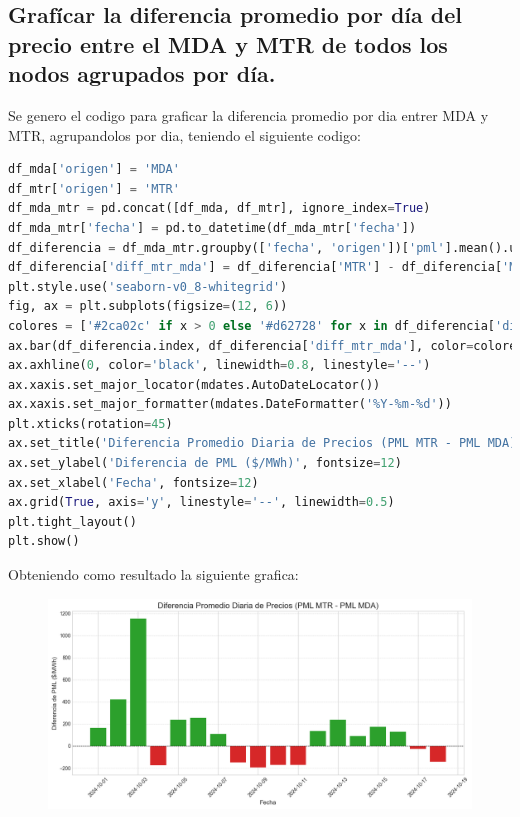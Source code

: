 \documentclass[11pt, a4paper]{article}
\begin{document}
\newpage
\subsection{Grafícar la diferencia promedio por día del precio entre el MDA y MTR de todos los nodos agrupados por día.}

Se genero el codigo para graficar la diferencia promedio por dia entrer MDA y MTR, agrupandolos por dia, teniendo el siguiente codigo:

\begin{lstlisting}[language=Python]
df_mda['origen'] = 'MDA'
df_mtr['origen'] = 'MTR'
df_mda_mtr = pd.concat([df_mda, df_mtr], ignore_index=True)
df_mda_mtr['fecha'] = pd.to_datetime(df_mda_mtr['fecha'])
df_diferencia = df_mda_mtr.groupby(['fecha', 'origen'])['pml'].mean().unstack()
df_diferencia['diff_mtr_mda'] = df_diferencia['MTR'] - df_diferencia['MDA']
plt.style.use('seaborn-v0_8-whitegrid')
fig, ax = plt.subplots(figsize=(12, 6))
colores = ['#2ca02c' if x > 0 else '#d62728' for x in df_diferencia['diff_mtr_mda']]
ax.bar(df_diferencia.index, df_diferencia['diff_mtr_mda'], color=colores, width=0.8)
ax.axhline(0, color='black', linewidth=0.8, linestyle='--')
ax.xaxis.set_major_locator(mdates.AutoDateLocator())
ax.xaxis.set_major_formatter(mdates.DateFormatter('%Y-%m-%d'))
plt.xticks(rotation=45)
ax.set_title('Diferencia Promedio Diaria de Precios (PML MTR - PML MDA)', fontsize=16)
ax.set_ylabel('Diferencia de PML ($/MWh)', fontsize=12)
ax.set_xlabel('Fecha', fontsize=12)
ax.grid(True, axis='y', linestyle='--', linewidth=0.5)
plt.tight_layout()
plt.show()
\end{lstlisting}

Obteniendo como resultado la siguiente grafica:
\begin{figure}[h!]
  \centering
  \includegraphics[width=\textwidth,keepaspectratio]{2_diff_prom_precio.png}
\end{figure}
\end{document}
